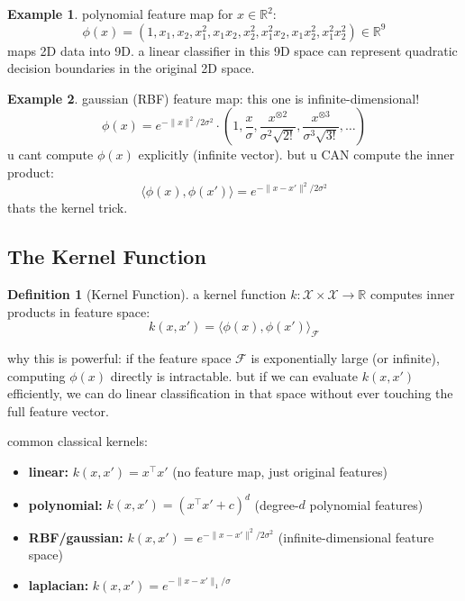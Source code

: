 \documentclass[11pt,a4paper]{article}
\theoremstyle{definition}
\newtheorem{definition}{Definition}[section]
\newtheorem{example}{Example}[section]
\theoremstyle{remark}
\begin{document}
\begin{example}
polynomial feature map for $x \in \mathbb{R}^2$:
\[
\phi(x) = (1, x_1, x_2, x_1^2, x_1 x_2, x_2^2, x_1^2 x_2, x_1 x_2^2, x_1^2 x_2^2) \in \mathbb{R}^9
\]
maps 2D data into 9D. a linear classifier in this 9D space can represent quadratic decision boundaries in the original 2D space.
\end{example}

\begin{example}
gaussian (RBF) feature map: this one is infinite-dimensional!
\[
\phi(x) = e^{-\|x\|^2/2\sigma^2} \cdot \left(1, \frac{x}{\sigma}, \frac{x^{\otimes 2}}{\sigma^2\sqrt{2!}}, \frac{x^{\otimes 3}}{\sigma^3\sqrt{3!}}, \ldots\right)
\]
u cant compute $\phi(x)$ explicitly (infinite vector). but u CAN compute the inner product:
\[
\langle \phi(x), \phi(x') \rangle = e^{-\|x - x'\|^2/2\sigma^2}
\]
thats the kernel trick.
\end{example}

\subsection{The Kernel Function}

\begin{definition}[Kernel Function]
a kernel function $k: \mathcal{X} \times \mathcal{X} \to \mathbb{R}$ computes inner products in feature space:
\[
k(x, x') = \langle \phi(x), \phi(x') \rangle_{\mathcal{F}}
\]
\end{definition}

why this is powerful: if the feature space $\mathcal{F}$ is exponentially large (or infinite), computing $\phi(x)$ directly is intractable. but if we can evaluate $k(x,x')$ efficiently, we can do linear classification in that space without ever touching the full feature vector.

common classical kernels:
\begin{itemize}
    \item \textbf{linear:} $k(x, x') = x^\top x'$ (no feature map, just original features)
    \item \textbf{polynomial:} $k(x, x') = (x^\top x' + c)^d$ (degree-$d$ polynomial features)
    \item \textbf{RBF/gaussian:} $k(x, x') = e^{-\|x-x'\|^2/2\sigma^2}$ (infinite-dimensional feature space)
    \item \textbf{laplacian:} $k(x, x') = e^{-\|x-x'\|_1/\sigma}$
\end{itemize}
\end{document}
